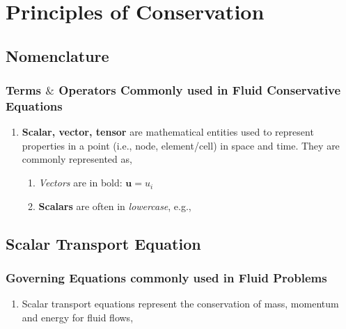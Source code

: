 \documentclass[10pt,compress,handout,ignorenonframetext]{beamer}
\begin{document}
\section{Principles of Conservation}

\subsection{Nomenclature} 

\begin{frame}
 \frametitle{Terms $\&$ Operators Commonly used in Fluid Conservative Equations} 
   \begin{enumerate}
      \item <1-> {\bf Scalar, vector, tensor} are mathematical entities used to represent properties in a point (i.e., node, element/cell) in space and time. They are commonly represented as,
      \begin{enumerate}
         \item<2-> {\it Vectors} are in bold: $\mathbf{u}=u_{i}$
         \item<3-> {\bf Scalars} are often in {\it lowercase}, e.g., 
      \end{enumerate}

   \end{enumerate}


\end{frame}



\subsection{Scalar Transport Equation} 

\begin{frame}
 \frametitle{Governing Equations commonly used in Fluid Problems} 
   \begin{enumerate}
      \item <1-> Scalar transport equations represent the conservation of mass, momentum and energy for fluid flows, 

   \end{enumerate}


\end{frame}
\end{document}
